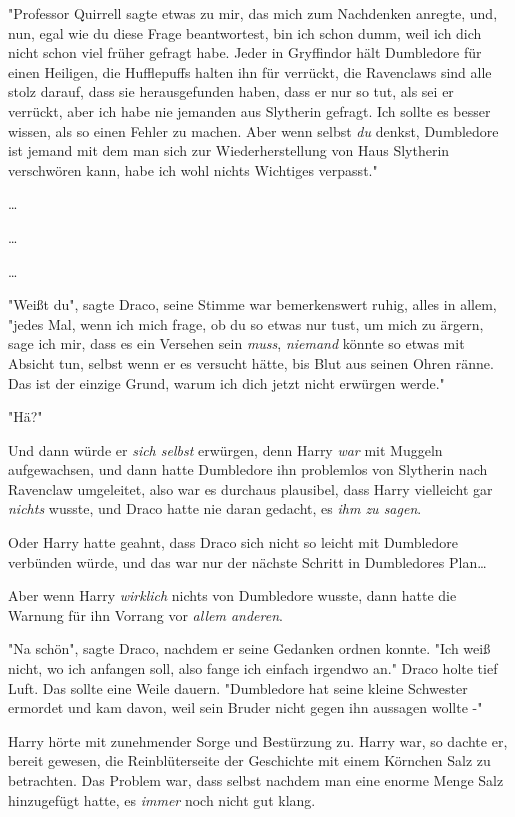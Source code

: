 {"Professor Quirrell sagte etwas zu mir, das mich zum Nachdenken anregte, und, nun, egal wie du diese Frage beantwortest, bin ich schon dumm, weil ich dich nicht schon viel früher gefragt habe. Jeder in Gryffindor hält Dumbledore für einen Heiligen, die Hufflepuffs halten ihn für verrückt, die Ravenclaws sind alle stolz darauf, dass sie herausgefunden haben, dass er nur so tut, als sei er verrückt, aber ich habe nie jemanden aus Slytherin gefragt. Ich sollte es besser wissen, als so einen Fehler zu machen. Aber wenn selbst \emph{du} denkst, Dumbledore ist jemand mit dem man sich zur Wiederherstellung von Haus Slytherin verschwören kann, habe ich wohl nichts Wichtiges verpasst."

…

…

…

"Weißt du", sagte Draco, seine Stimme war bemerkenswert ruhig, alles in allem, "jedes Mal, wenn ich mich frage, ob du so etwas nur tust, um mich zu ärgern, sage ich mir, dass es ein Versehen sein \emph{muss}, \emph{niemand} könnte so etwas mit Absicht tun, selbst wenn er es versucht hätte, bis Blut aus seinen Ohren ränne. Das ist der einzige Grund, warum ich dich jetzt nicht erwürgen werde."

"Hä?"

Und dann würde er \emph{sich selbst} erwürgen, denn Harry \emph{war} mit Muggeln aufgewachsen, und dann hatte Dumbledore ihn problemlos von Slytherin nach Ravenclaw umgeleitet, also war es durchaus plausibel, dass Harry vielleicht gar \emph{nichts} wusste, und Draco hatte nie daran gedacht, es \emph{ihm zu sagen}.

Oder Harry hatte geahnt, dass Draco sich nicht so leicht mit Dumbledore verbünden würde, und das war nur der nächste Schritt in Dumbledores Plan…

Aber wenn Harry \emph{wirklich} nichts von Dumbledore wusste, dann hatte die Warnung für ihn Vorrang vor \emph{allem anderen}.

"Na schön", sagte Draco, nachdem er seine Gedanken ordnen konnte. "Ich weiß nicht, wo ich anfangen soll, also fange ich einfach irgendwo an." Draco holte tief Luft. Das sollte eine Weile dauern. "Dumbledore hat seine kleine Schwester ermordet und kam davon, weil sein Bruder nicht gegen ihn aussagen wollte -"

Harry hörte mit zunehmender Sorge und Bestürzung zu. Harry war, so dachte er, bereit gewesen, die Reinblüterseite der Geschichte mit einem Körnchen Salz zu betrachten. Das Problem war, dass selbst nachdem man eine enorme Menge Salz hinzugefügt hatte, es \emph{immer} noch nicht gut klang.

}
